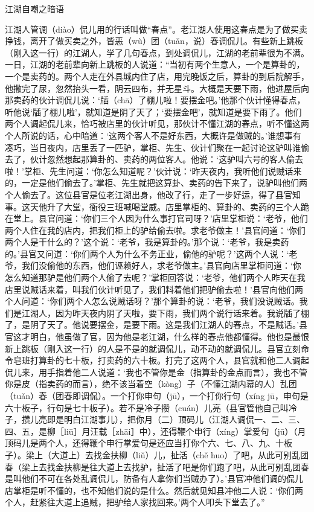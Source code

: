 \documentclass[12pt,UTF8]{ctexbook}
\begin{document}
江湖自嘲之暗语


江湖人管调（diào）侃儿用的行话叫做“春点”。老江湖人使用这春点是为了做买卖挣钱，离开了做买卖之外，皆恶（wù）团（tuǎn，说）春调侃儿。有些新上跳板（刚入这一行）的江湖人，学了几句春点，到处调侃儿，江湖的老前辈很为不满。一日，江湖的老前辈向新上跳板的人说道：“当初有两个生意人，一个是算卦的，一个是卖药的。两个人走在外县城内住了店，用完晚饭之后，算卦的到后院解手，他撒完了尿，忽然抬头一看，阴云四布，并无星斗。大概是天要下雨，他进屋后向那卖药的伙计调侃儿说：‘牐（chā）了棚儿啦！要摆金吧。’他那个伙计懂得春点，听他说‘牐了棚儿啦’，就知道是阴了天了；‘要摆金吧’，就知道是要下雨了。他们两个人调起侃儿来，恰巧被店里的伙计听见，那伙计不懂江湖的春点，听不懂这两个人所说的话，心中暗道：‘这两个客人不是好东西，大概许是做贼的。’谁想事有凑巧，当日夜内，店里丢了一匹驴，掌柜、先生、伙计们聚在一起讨论这驴叫谁偷去了，伙计忽然想起那算卦的、卖药的两位客人。他说：‘这驴叫六号的客人偷去啦！’掌柜、先生问道：‘你怎么知道呢？’伙计说：‘昨天夜内，我听他们说贼话来的，一定是他们偷去了。’掌柜、先生就把这算卦、卖药的告下来了，说驴叫他们两个人偷去了。这位县官是位老江湖出身，他改了行，走了一步好运，得了县官知事。这天他升了大堂，衙役三班喊喝堂威。店里掌柜的、算卦的、卖药的三个人跪在堂上。县官问道：‘你们三个人因为什么事打官司呀？’店里掌柜说：‘老爷，他们两个人住在我的店内，把我们柜上的驴给偷去啦。求老爷做主！’县官问道：‘你们两个人是干什么的？’这个说：‘老爷，我是算卦的。’那个说：‘老爷，我是卖药的。’县官又问道：‘你们两个人为什么不务正业，偷他的驴呢？’这两个人说：‘老爷，我们没偷他的东西，他们诬赖好人，求老爷做主。’县官向店里掌柜问道：‘你怎么知道那驴是他们两个人偷了去呢？’掌柜回答说：‘老爷，他们两个人昨天在我店里说贼话来着，叫我们伙计听见了，我们料着他们把驴偷去啦！’县官向他们两个人问道：‘你们两个人怎么说贼话呀？’那个算卦的说：‘老爷，我们没说贼话。我们是江湖人，因为昨天夜内阴了天啦，要下雨，我们两个说行话来着。我说牐了棚了，是阴了天了。他说要摆金，是要下雨。这是我们江湖人的春点，不是贼话。’县官这才明白，他虽做了官，因为他是老江湖，什么样的春点他都懂得。他也是最恨新上跳板（刚入这一行）的人是不是的就调侃儿，动不动的就调侃儿。县官立刻命令皂班打算卦的七十板，打卖药的六十板。打完了这两个人，县官就和他二人调起侃儿来，用手指着他二人说道：‘我也不管你是金（指算卦的金点而言），我也不管你是皮（指卖药的而言），绝不该当着空（kòng）子（不懂江湖内幕的人）乱团（tuǎn）春（团春即调侃）。一个打你申句（jū），一个打你行句（xíng jū，申句是六十板子，行句是七十板子）。若不是冷子攒（cuán）儿亮（县官管他自己叫冷子，攒儿亮即是明白江湖事儿），把你月（二）顶码儿（江湖人调侃一、二、三、四、五，是柳［liū］月汪载［zhāi］中），还得鞭个申行（xíng）掌爱句（jū）（月顶码儿是两个人，还得鞭个申行掌爱句是还应当打你个六、七、八、九、十板子）。梁上（大道上）去找金扶柳（liǔ）儿，扯活（chě huo）了吧，从此可别乱团春（梁上去找金扶柳是往大道上去找驴，扯活了吧是你们跑了吧，从此可别乱团春是叫他们不可在各处乱调侃儿，防备有人拿你们当贼办了）。’县官冲他们调的侃儿店掌柜是听不懂的，也不知他们说的是什么。然后就见知县冲他二人说：‘你们两个人，赶紧往大道上追贼，把驴给人家找回来。’两个人叩头下堂去了。”
\end{document}
